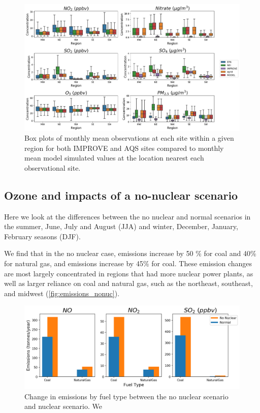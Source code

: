 \documentclass[12]{article}
\begin{document}
\begin{figure}
    \centering
    \includegraphics[scale=0.5]{model_validation/Figures/obs_boxplots.png}
    \caption{Box plots of monthly mean observations at each site within a given region for both IMPROVE and AQS sites compared to monthly mean model simulated values at the location nearest each observational site.} 
    \label{fig:obs_model}
\end{figure}


\subsection{Ozone and  impacts of a no-nuclear scenario}
Here we look at the differences between the no nuclear and normal scenarios in the summer, June, July and August (JJA) and winter, December, January, February seasons (DJF). 

We find that in the no nuclear case,  emissions increase by 50 \% for coal and 40\% for natural gas, and  emissions increase by 45\% for coal. These emission changes are most largely concentrated in regions that had more nuclear power plants, as well as larger reliance on coal and natural gas, such as the northeast, southeast, and midwest (\ref{fig:emissions_nonuc}). 

\begin{figure}
    \centering
    \includegraphics[scale=0.4]{ego_nonuclear_project/Figures/emissions_fueltype.png}
    \caption{Change in emissions by fuel type between the no nuclear scenario and nuclear scenario. We } 
    \label{fig:emissions_comp}
\end{figure}
\end{document}
